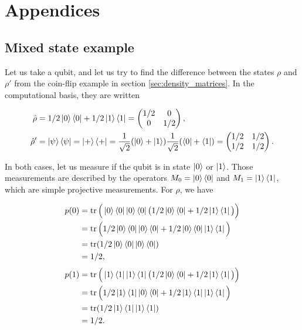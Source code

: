 \appendix
\chapter*{Appendices}
\renewcommand{\thesection}{\Alph{section}}

\section{Mixed state example}
\label{app:mixed_example}

Let us take a qubit, and let us try to find the difference between the states $\rho$ and $\rho'$ from the coin-flip example in section \ref{sec:density_matrices}. In the computational basis, they are written

\begin{align}
    \hat{\rho} &= 1/2 \ket{0}\bra{0} + 1/2 \ket{1}\bra{1} = \left(\begin{matrix}
        1/2 & 0\\
        0 & 1/2
    \end{matrix}\right),\\
    \hat{\rho}' &= \ket{\psi}\bra{\psi} = \ket{+}\bra{+} = \frac{1}{\sqrt{2}}(\ket{0} + \ket{1})\frac{1}{\sqrt{2}}(\bra{0} + \bra{1}) = \left(\begin{matrix}
        1/2 & 1/2\\
        1/2 & 1/2
    \end{matrix}\right).
\end{align}

In both cases, let us measure if the qubit is in state $\ket{0}$ or $\ket{1}$. Those measurements are described by the operators $M_0 = \ket{0}\bra{0}$ and $M_1 = \ket{1}\bra{1}$, which are simple projective measurements. For $\rho$, we have

\begin{align}
    p(0) &= \operatorname{tr}\Big(\ket{0}\bra{0}\ket{0}\bra{0}\big(1/2 \ket{0}\bra{0} + 1/2 \ket{1}\bra{1}\big)\Big)\\
         &= \operatorname{tr}\Big(1/2 \ket{0}\bra{0}\ket{0}\bra{0} + 1/2 \ket{0}\bra{0}\ket{1}\bra{1}\Big)\\
         &= \operatorname{tr}(1/2 \ket{0}\bra{0}\ket{0}\bra{0})\\
         &= 1/2,
\end{align}
\begin{align}
    p(1) &= \operatorname{tr}\Big(\ket{1}\bra{1}\ket{1}\bra{1}\big(1/2 \ket{0}\bra{0} + 1/2 \ket{1}\bra{1}\big)\Big)\\
         &= \operatorname{tr}\Big(1/2 \ket{1}\bra{1}\ket{0}\bra{0} + 1/2 \ket{1}\bra{1}\ket{1}\bra{1}\Big)\\
         &= \operatorname{tr}(1/2 \ket{1}\bra{1}\ket{1}\bra{1})\\
         &= 1/2.
\end{align}

